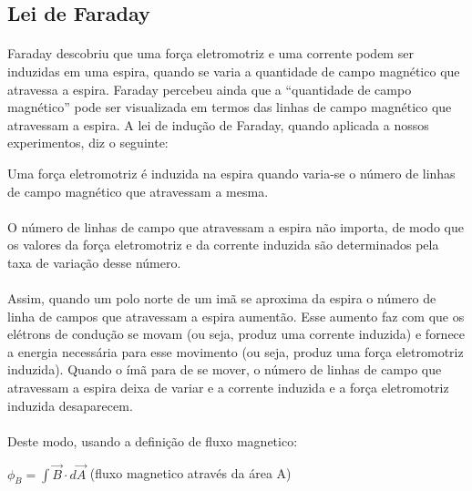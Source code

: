 \documentclass[a4paper, 12pt]{article}
\begin{document}
    \subsection{Lei de Faraday}

\paragraph{}Faraday descobriu que uma força eletromotriz e uma corrente podem ser induzidas em uma espira, quando se varia a quantidade de campo magnético que atravessa a espira. Faraday percebeu ainda que a “quantidade de campo magnético” pode ser visualizada em termos das linhas de campo magnético que atravessam a espira. A lei de indução de Faraday, quando aplicada a
nossos experimentos, diz o seguinte:
\\
\begin{mdframed}[backgroundcolor=gray!20]
	\begin{center}
		Uma força eletromotriz é induzida na espira quando varia-se o número de linhas de campo magnético que atravessam a mesma.
		\end{center}
\end{mdframed}

\paragraph{}O número de linhas de campo que atravessam a espira não importa, de modo que os valores da força eletromotriz e da corrente induzida são determinados pela taxa de variação desse número.

\paragraph{}Assim, quando um polo norte de um imã se aproxima da espira o número de linha de campos que atravessam a espira aumentão. Esse aumento faz com que os elétrons de condução se movam (ou seja, produz uma corrente induzida) e fornece a energia necessária para esse movimento (ou seja, produz uma força eletromotriz induzida). Quando o ímã para de se mover, o número de linhas de campo que atravessam a espira deixa de variar e a corrente induzida e a força eletromotriz induzida desaparecem.

\paragraph{}Deste modo, usando a definição de fluxo magnetico:  
\\
\begin{mdframed}[backgroundcolor=gray!20]
	\begin{center}
		$\phi_B = \int \overrightarrow{B} \cdot d\overrightarrow{A} $ (fluxo magnetico através da área A)
		\end{center}
\end{mdframed}
\end{document}
